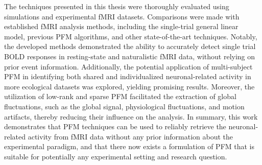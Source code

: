 The techniques presented in this thesis were thoroughly evaluated using
simulations and experimental fMRI datasets. Comparisons were made with
established fMRI analysis methods, including the single-trial
general linear model, previous PFM algorithms, and other
state-of-the-art techniques. Notably, the developed methods demonstrated the
ability to accurately detect single trial BOLD responses in resting-state and
naturalistic fMRI data, without relying on prior event information.
Additionally, the potential application of multi-subject PFM in
identifying both shared and individualized neuronal-related activity in more
ecological datasets was explored, yielding promising results. Moreover, the
utilization of low-rank and sparse PFM facilitated the extraction of
global fluctuations, such as the global signal, physiological fluctuations, and
motion artifacts, thereby reducing their influence on the analysis. In summary,
this work demonstrates that PFM techniques can be used to reliably
retrieve the neuronal-related activity from fMRI data without any prior
information about the experimental paradigm, and that there now exists a
formulation of PFM that is suitable for potentially any experimental
setting and research question.
